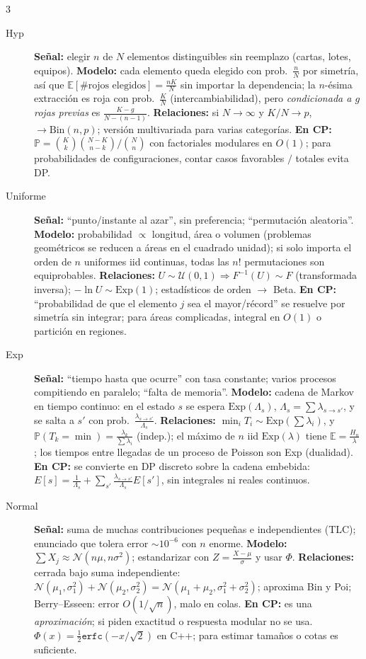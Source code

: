 \documentclass[8pt, spanish, mexico, letterpaper]{extarticle}
\newcommand{\E}{\mathbb{E}}
\newcommand{\Prob}{\mathbb{P}}
\newcommand{\<}{<}
\begin{document}
\begin{multicols*}{3}
\begin{description}
\item[Hyp] \textbf{Señal:} elegir $n$ de $N$ elementos distinguibles sin reemplazo (cartas, lotes, equipos). \textbf{Modelo:} cada elemento queda elegido con prob.\ $\frac nN$ por simetría, así que $\E[\#\text{rojos elegidos}]=\frac{nK}N$ sin importar la dependencia; la $n$-ésima extracción es roja con prob.\ $\frac KN$ (intercambiabilidad), pero \emph{condicionada a $g$ rojas previas} es $\frac{K-g}{N-(n-1)}$. \textbf{Relaciones:} si $N\to\infty$ y $K/N\to p$, $\to\mathrm{Bin}(n,p)$; versión multivariada para varias categorías. \textbf{En CP:} $\Prob=\binom Kk\binom{N-K}{n-k}/\binom Nn$ con factoriales modulares en $O(1)$; para probabilidades de configuraciones, contar casos favorables $/$ totales evita DP.

\item[Uniforme] \textbf{Señal:} ``punto/instante al azar'', sin preferencia; ``permutación aleatoria''. \textbf{Modelo:} probabilidad $\propto$ longitud, área o volumen (problemas geométricos se reducen a áreas en el cuadrado unidad); si solo importa el orden de $n$ uniformes iid continuas, todas las $n!$ permutaciones son equiprobables. \textbf{Relaciones:} $U\sim\mathcal U(0,1)\Rightarrow F^{-1}(U)\sim F$ (transformada inversa); $-\ln U\sim\mathrm{Exp}(1)$; estadísticos de orden $\to$ Beta. \textbf{En CP:} ``probabilidad de que el elemento $j$ sea el mayor/récord'' se resuelve por simetría sin integrar; para áreas complicadas, integral en $O(1)$ o partición en regiones.

\item[Exp] \textbf{Señal:} ``tiempo hasta que ocurre'' con tasa constante; varios procesos compitiendo en paralelo; ``falta de memoria''. \textbf{Modelo:} cadena de Markov en tiempo continuo: en el estado $s$ se espera $\mathrm{Exp}(\Lambda_s)$, $\Lambda_s=\sum\lambda_{s\to s'}$, y se salta a $s'$ con prob.\ $\frac{\lambda_{s\to s'}}{\Lambda_s}$. \textbf{Relaciones:} $\min_iT_i\sim\mathrm{Exp}(\sum\lambda_i)$, y $\Prob(T_k{=}\min)=\frac{\lambda_k}{\sum\lambda_i}$ (indep.); el máximo de $n$ iid $\mathrm{Exp}(\lambda)$ tiene $\E=\frac{H_n}\lambda$; los tiempos entre llegadas de un proceso de Poisson son Exp (dualidad). \textbf{En CP:} se convierte en DP discreto sobre la cadena embebida: $E[s]=\frac1{\Lambda_s}+\sum_{s'}\frac{\lambda_{s\to s'}}{\Lambda_s}E[s']$, sin integrales ni reales continuos.

\item[Normal] \textbf{Señal:} suma de muchas contribuciones pequeñas e independientes (TLC); enunciado que tolera error $\sim10^{-6}$ con $n$ enorme. \textbf{Modelo:} $\sum X_j\approx\mathcal N(n\mu,n\sigma^2)$; estandarizar con $Z=\frac{X-\mu}\sigma$ y usar $\Phi$. \textbf{Relaciones:} cerrada bajo suma independiente: $\mathcal N(\mu_1,\sigma_1^2)+\mathcal N(\mu_2,\sigma_2^2)=\mathcal N(\mu_1 + \mu_2,\sigma_1^2 + \sigma_2^2)$; aproxima Bin y Poi; Berry--Esseen: error $O(1/\sqrt n)$, malo en colas. \textbf{En CP:} es una \emph{aproximación}; si piden exactitud o respuesta modular no se usa. $\Phi(x)=\frac12\texttt{erfc}(-x/\sqrt2)$ en C++; para estimar tamaños o cotas es suficiente.


\end{description}
\end{multicols*}
\end{document}
